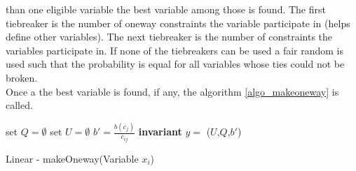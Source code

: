 than one eligible variable the best variable among those is found. The first tiebreaker is the number of oneway 
constraints the variable participate in (helps define other variables). The next tiebreaker is the number of constraints 
the variables participate in. If none of the tiebreakers can be used a fair random 
is used such that the probability is equal for all variables whose ties could not be broken. \\ 
Once a the best variable is found, if any, the algorithm \ref{algo_makeoneway} \makeOneway is called. \\
\IncMargin{1em}
\begin{algorithm}[H]
\algdata
{}
\BlankLine
set $Q = \emptyset$ 
set $U = \emptyset$ 
\int $b' = \frac{b(c_j)}{c_{ij}}$ \; 
\textbf{invariant} $y = $ \Sum($U$,$Q$,$b'$)\; 

 \caption{Linear - makeOneway(\textsf{Variable} $x_i$)} \label{algo_makeoneway}
\end{algorithm}\DecMargin{1em} \noindent
